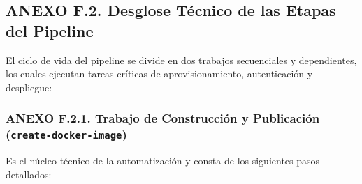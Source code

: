 \subsection{ANEXO F.2. Desglose Técnico de las Etapas del
Pipeline}\label{anexo-f.2.-desglose-tuxe9cnico-de-las-etapas-del-pipeline}

El ciclo de vida del pipeline se divide en dos trabajos secuenciales y
dependientes, los cuales ejecutan tareas críticas de aprovisionamiento,
autenticación y despliegue:

\subsubsection{\texorpdfstring{ANEXO F.2.1. Trabajo de Construcción y
Publicación
(\texttt{create-docker-image})}{ANEXO F.2.1. Trabajo de Construcción y Publicación (create-docker-image)}}\label{anexo-f.2.1.-trabajo-de-construcciuxf3n-y-publicaciuxf3n-create-docker-image}

Es el núcleo técnico de la automatización y consta de los siguientes
pasos detallados:

